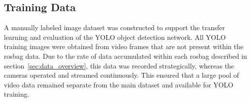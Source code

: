 \documentclass{erauthesis}
\begin{document}


\subsection{Training Data} \label{sec:yolo_training_data}

A manually labeled image dataset was constructed to support the transfer learning and evaluation of the YOLO object detection network. 
All YOLO training images were obtained from video frames that are not present within the rosbag data.
Due to the rate of data accumulated within each rosbag described in section~\ref{sec:data_overview}, this data was recorded strategically,  whereas the cameras operated and streamed continuously.
This ensured that a large pool of video data remained separate from the main dataset and available for YOLO training.
\end{document}
